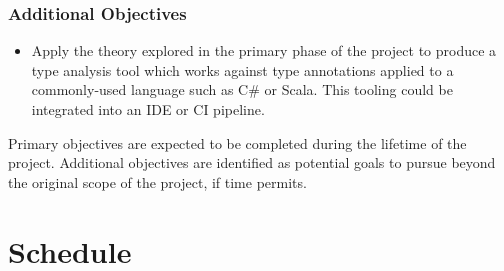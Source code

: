 \documentclass[a4paper,openany,12pt]{book}
\newcommand{\infobox}[1] {\colorbox{id7-bright-emerald-green}{\parbox{\textwidth}{\vspace{.75\baselineskip}\centering\parbox{0.95\textwidth}{\faIcon{info-circle} #1\vspace{.75\baselineskip}}}}}
\begin{document}
\subsubsection*{Additional Objectives}

\begin{itemize}
    \item Apply the theory explored in the primary phase of the project to produce a type analysis tool which works against type annotations applied to a commonly-used language such as C\# or Scala. This tooling could be integrated into an IDE or CI pipeline.
\end{itemize}

\textit{}\infobox{Primary objectives are expected to be completed during the lifetime of the project. Additional objectives are identified as potential goals to pursue beyond the original scope of the project, if time permits.}

\section*{Schedule}
\end{document}
